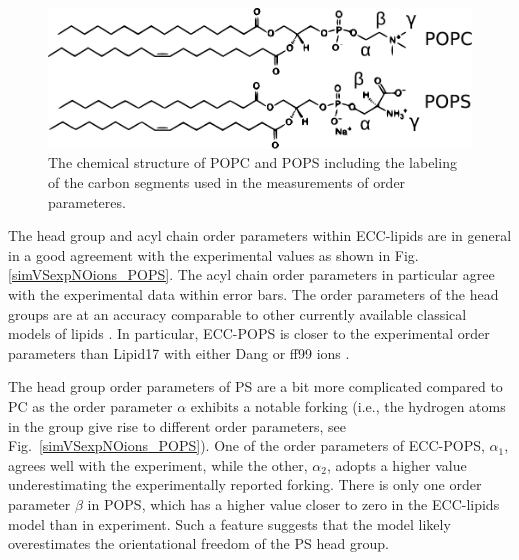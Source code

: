 \documentclass[journal=jpcbfk,manuscript=article]{achemso}
\newlength{\figwidth}
\begin{document}
\begin{figure}[tb!] 
  \centering 
  \includegraphics[width=\figwidth]{../Fig/lipids_chemfig_POPC_POPS.pdf} 
  \caption{ \label{fig:chemstruct_pc_ps} 
            The chemical structure of POPC and POPS 
            including the labeling of the carbon segments
            used in the measurements of order parameteres. 
  }  
\end{figure} 
 
The head group and acyl chain order parameters within ECC-lipids
are in general in a good agreement with the experimental values 
as shown in Fig. \ref{simVSexpNOions_POPS}. 
The acyl chain order parameters in particular agree with the experimental data within error bars.
The order parameters of the head groups are at an accuracy comparable to 
other currently available classical models of lipids \citep{botan15, catte16, Pluhackova2016, nmrlipids_proj4}. 
In particular, ECC-POPS is closer to the experimental order parameters 
than Lipid17 with either Dang \cite{smith94,chang1999,dang2006} 
or ff99 ions \citet{aqvist90}. 

The head group order parameters of PS are a bit more complicated 
compared to PC as the order parameter $\alpha$ exhibits a notable forking 
(i.e., the hydrogen atoms in the group give rise to different order parameters, see Fig.~\ref{simVSexpNOions_POPS}).
One of the order parameters of ECC-POPS, $\alpha_1$, agrees well with the experiment, 
while the other, $\alpha_2$, adopts a higher value underestimating the experimentally reported forking. 
There is only one order parameter $\beta$ in POPS, 
which has a higher value closer to zero in the ECC-lipids model than in experiment. 
Such a feature suggests that the model likely overestimates the orientational freedom of the PS head group. 
\end{document}
